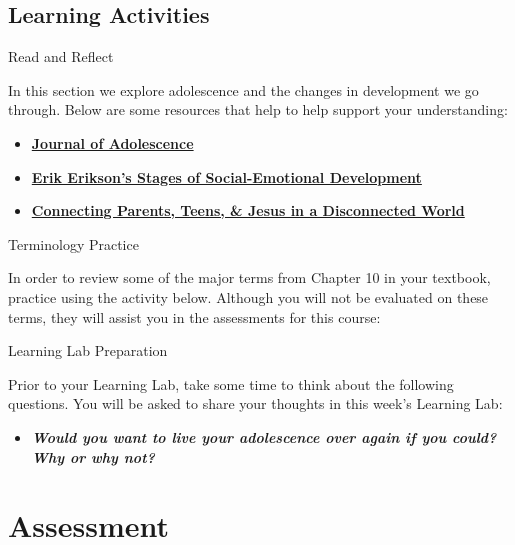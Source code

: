 \documentclass[
]{book}
\providecommand{\tightlist}{%
  \setlength{\itemsep}{0pt}\setlength{\parskip}{0pt}}
\begin{document}
\hypertarget{learning-activities}{%
\subsection*{Learning Activities}\label{learning-activities}}

\begin{reflect}
{Read and Reflect}

In this section we explore adolescence and the changes in development we go through. Below are some resources that help to help support your understanding:

\begin{itemize}
\tightlist
\item
  \href{https://www.sciencedirect.com/journal/journal-of-adolescence}{\textbf{Journal of Adolescence}}\\
\item
  \href{https://childdevelopmentinfo.com/child-development/erickson/\#gs.d8mpcv}{\textbf{Erik Erikson's Stages of Social-Emotional Development}}\\
\item
  \href{https://axis.org/}{\textbf{Connecting Parents, Teens, \& Jesus in a Disconnected World}}
\end{itemize}

{Terminology Practice}

In order to review some of the major terms from Chapter 10 in your textbook, practice using the activity below. Although you will not be evaluated on these terms, they will assist you in the assessments for this course:

{Learning Lab Preparation}

Prior to your Learning Lab, take some time to think about the following questions. You will be asked to share your thoughts in this week's Learning Lab:

\begin{itemize}
\tightlist
\item
  \textbf{\emph{Would you want to live your adolescence over again if you could? Why or why not?}}
\end{itemize}
\end{reflect}

\hypertarget{assessment-2}{%
\section*{Assessment}\label{assessment-2}}
\end{document}
